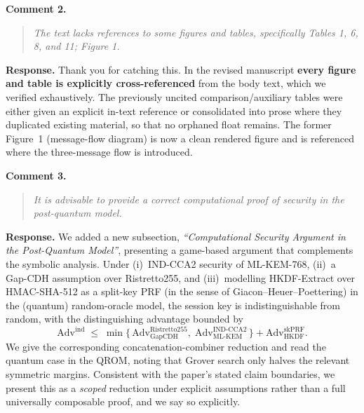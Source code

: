 \documentclass[11pt,a4paper]{article}
\newcommand{\rc}[1]{\par\smallskip\begin{quote}\textcolor{rcol}{\itshape #1}\end{quote}\par}
\begin{document}
\noindent\textbf{Comment 2.}
\rc{The text lacks references to some figures and tables, specifically Tables 1, 6, 8, and 11; Figure 1.}
\noindent\textbf{Response.} Thank you for catching this. In the revised manuscript \textbf{every figure and table is explicitly cross-referenced} from the body text, which we verified exhaustively. The previously uncited comparison/auxiliary tables were either given an explicit in-text reference or consolidated into prose where they duplicated existing material, so that no orphaned float remains. The former Figure~1 (message-flow diagram) is now a clean rendered figure and is referenced where the three-message flow is introduced.

\noindent\textbf{Comment 3.}
\rc{It is advisable to provide a correct computational proof of security in the post-quantum model.}
\noindent\textbf{Response.} We added a new subsection, \emph{``Computational Security Argument in the Post-Quantum Model''}, presenting a game-based argument that complements the symbolic analysis. Under (i)~IND-CCA2 security of ML-KEM-768, (ii)~a Gap-CDH assumption over Ristretto255, and (iii)~modelling HKDF-Extract over HMAC-SHA-512 as a split-key PRF (in the sense of Giacon--Heuer--Poettering) in the (quantum) random-oracle model, the session key is indistinguishable from random, with the distinguishing advantage bounded by
\[
  \mathrm{Adv}^{\mathrm{ind}} \;\le\;
  \min\!\bigl\{\, \mathrm{Adv}_{\mathrm{GapCDH}}^{\mathrm{Ristretto255}},\;
  \mathrm{Adv}_{\mathrm{ML\text{-}KEM}}^{\mathrm{IND\text{-}CCA2}} \,\bigr\}
  + \mathrm{Adv}_{\mathrm{HKDF}}^{\mathrm{skPRF}} .
\]
We give the corresponding concatenation-combiner reduction and read the quantum case in the QROM, noting that Grover search only halves the relevant symmetric margins. Consistent with the paper's stated claim boundaries, we present this as a \emph{scoped} reduction under explicit assumptions rather than a full universally composable proof, and we say so explicitly.
\end{document}

